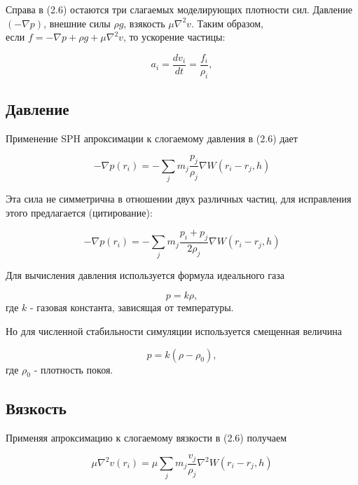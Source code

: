 Справа в (2.6) остаются три слагаемых моделирующих плотности сил. Давление
$(-\nabla p)$, внешние силы $\rho g$, взякость $\mu \nabla^2 v$. Таким образом, \\
если $f = - \nabla p + \rho g + \mu \nabla^2 v$, то
ускорение частицы:

\begin{equation}
	a_i = \frac{dv_i}{dt} = \frac{f_i}{\rho_i},
\end{equation}

\subsection{Давление}

Применение SPH апроксимации к слогаемому давления в (2.6) дает

\begin{equation}
	- \nabla p(r_i) = - \sum_j m_j \frac{p_j}{\rho_j} \nabla W(r_i - r_j, h)
\end{equation}

Эта сила не симметрична в отношении двух различных частиц, для исправления этого
предлагается (цитирование):

\begin{equation}
	- \nabla p(r_i) = - \sum_j m_j \frac{p_i + p_j}{2\rho_j} \nabla W(r_i - r_j, h)
\end{equation}

Для вычисления давления используется формула идеального газа

\begin{equation}
	p = k \rho,
\end{equation}
где $k$ - газовая константа, зависящая от температуры.

Но для численной стабильности симуляции используется смещенная величина

\begin{equation}
	p = k (\rho - \rho_0),
\end{equation}
где $\rho_0$ - плотность покоя.


\subsection{Вязкость}

Применяя апроксимацию к слогаемому вязкости в (2.6) получаем

\begin{equation}
	\mu \nabla^2 v(r_i) = \mu \sum_j m_j \frac{v_j}{\rho_j} \nabla^2 W(r_i - r_j,
	h)
\end{equation}

